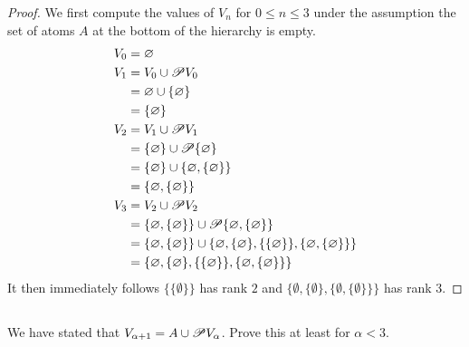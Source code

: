 \documentclass{report}
\begin{document}
\begin{proof}

  We first compute the values of $V_n$ for $0 \leq n \leq 3$ under the
    assumption the set of atoms $A$ at the bottom of the hierarchy is empty.
  \begin{align*}
    V_0 & = \varnothing \\
    V_1 & = V_0 \cup \mathscr{P}V_0 \\
        & = \varnothing \cup \{\varnothing\} \\
        & = \{\varnothing\} \\
    V_2 & = V_1 \cup \mathscr{P}V_1 \\
        & = \{\varnothing\} \cup \mathscr{P}\{\varnothing\} \\
        & = \{\varnothing\} \cup \{\varnothing, \{\varnothing\}\} \\
        & = \{\varnothing, \{\varnothing\}\} \\
    V_3 & = V_2 \cup \mathscr{P}V_2 \\
        & = \{\varnothing, \{\varnothing\}\} \cup
            \mathscr{P}\{\varnothing, \{\varnothing\}\} \\
        & = \{\varnothing, \{\varnothing\}\} \cup
            \{\varnothing,
              \{\varnothing\},
              \{\{\varnothing\}\},
              \{\varnothing, \{\varnothing\}\}\} \\
        & = \{\varnothing,
              \{\varnothing\},
              \{\{\varnothing\}\},
              \{\varnothing, \{\varnothing\}\}\}
  \end{align*}
  It then immediately follows $\{\{\emptyset\}\}$ has rank $2$ and
    $\{\emptyset, \{\emptyset\}, \{\emptyset, \{\emptyset\}\}\}$ has rank $3$.

\end{proof}

\subsection{}%

We have stated that $V_{\alpha + 1} = A \cup \mathscr{P}V_\alpha$.
Prove this at least for $\alpha < 3$.
\end{document}

